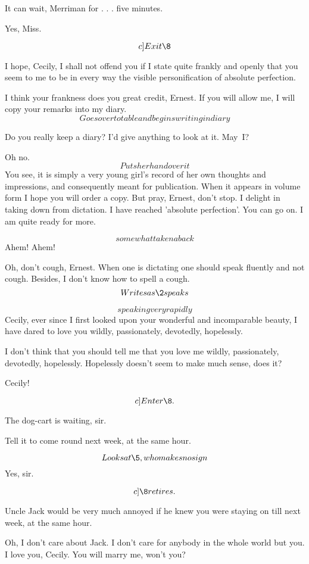 \documentclass{book}
\begin{document}
\5  It can wait, Merriman for . . . five minutes.

\8  Yes, Miss.

\[c]Exit \8\]

\2  I hope, Cecily, I shall not offend you if I state quite
frankly and openly that you seem to me to be in every way the
visible personification of absolute perfection.

\5  I think your frankness does you great credit, Ernest.  If
you will allow me, I will copy your remarks into my diary.  \[Goes
over to table and begins writing in diary\]

\2  Do you really keep a diary?  I'd give anything to look
at it.  May~I?

\5  Oh no.  \[Puts her hand over it\]  You see, it is simply a
very young girl's record of her own thoughts and impressions, and
consequently meant for publication.  When it appears in volume form
I hope you will order a copy.  But pray, Ernest, don't stop.  I
delight in taking down from dictation.  I have reached 'absolute
perfection'.  You can go on.  I am quite ready for more.

\2  \[somewhat taken aback\]  Ahem!  Ahem!

\5  Oh, don't cough, Ernest.  When one is dictating one should
speak fluently and not cough.  Besides, I don't know how to spell a
cough.  \[Writes as \2 speaks\]

\2  \[speaking very rapidly\]  Cecily, ever since I first
looked upon your wonderful and incomparable beauty, I have dared to
love you wildly, passionately, devotedly, hopelessly.

\5  I don't think that you should tell me that you love me
wildly, passionately, devotedly, hopelessly.  Hopelessly doesn't
seem to make much sense, does it?

\2  Cecily!

\[c]Enter \8.\]

\8  The dog-cart is waiting, sir.

\2  Tell it to come round next week, at the same hour.

\8  \[Looks at \5, who makes no sign\]  Yes, sir.

\[c]\8 retires.\]

\5  Uncle Jack would be very much annoyed if he knew you were
staying on till next week, at the same hour.

\2  Oh, I don't care about Jack.  I don't care for anybody
in the whole world but you.  I love you, Cecily.  You will marry
me, won't you?
\end{document}
